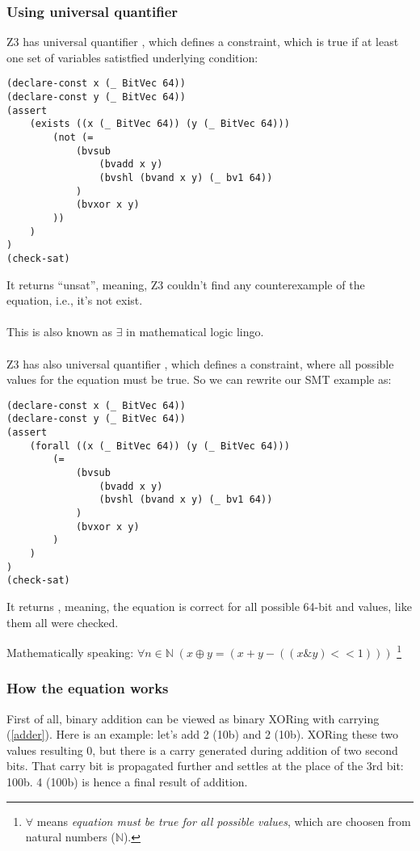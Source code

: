 \subsubsection{Using universal quantifier}

Z3 has universal quantifier , which defines a constraint, which is true if at least one set of variables satistfied underlying condition:

\begin{lstlisting}
(declare-const x (_ BitVec 64))
(declare-const y (_ BitVec 64))
(assert 
	(exists ((x (_ BitVec 64)) (y (_ BitVec 64)))
		(not (=
			(bvsub 
				(bvadd x y)
				(bvshl (bvand x y) (_ bv1 64))
			)
			(bvxor x y)
		))
	)
)
(check-sat)
\end{lstlisting}

It returns ``unsat'', meaning, Z3 couldn't find any counterexample of the equation, i.e., it's not exist.\\
\\
This is also known as $\exists$ in mathematical logic lingo.\\
\\
Z3 has also universal quantifier , which defines a constraint, where all possible values for the equation must be true.
So we can rewrite our \ac{SMT} example as:

\begin{lstlisting}
(declare-const x (_ BitVec 64))
(declare-const y (_ BitVec 64))
(assert 
	(forall ((x (_ BitVec 64)) (y (_ BitVec 64)))
		(=
			(bvsub 
				(bvadd x y)
				(bvshl (bvand x y) (_ bv1 64))
			)
			(bvxor x y)
		)
	)
)
(check-sat)
\end{lstlisting}

It returns , meaning, the equation is correct for all possible 64-bit  and  values, like them all were checked.

Mathematically speaking: $\forall n\!\in\!\mathbb{N}\; (x \oplus y = (x + y - ((x \& y)<<1)))$
\footnote{
$\forall$ means \textit{equation must be true for all possible values}, which are choosen from natural numbers ($\mathbb{N}$).}

\subsubsection{How the equation works}

First of all, binary addition can be viewed as binary XORing with carrying (\ref{adder}).
Here is an example: let's add 2 (10b) and 2 (10b).
XORing these two values resulting 0, but there is a carry generated during addition of two second bits.
That carry bit is propagated further and settles at the place of the 3rd bit: 100b.
4 (100b) is hence a final result of addition.

